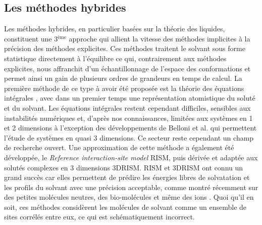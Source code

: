 \subsection{Les méthodes hybrides}
Les méthodes hybrides, en particulier basées sur la théorie des liquides, constituent une 3$^{\text{ème}}$ approche qui allient la vitesse des méthodes implicites à la précision des méthodes explicites. Ces méthodes traitent le solvant sous forme statistique directement à l'équilibre ce qui, contrairement aux méthodes explicites, nous affranchit d'un échantillonnage de l'espace des conformations et permet ainsi un gain de plusieurs ordres de grandeurs en temps de calcul. La première méthode de ce type à avoir été proposée est la théorie des équations intégrales \cite{hansen_theory_2006,gray_theory_1984,hirata_molecular_2003}, avec dans un premier temps une représentation atomistique du soluté et du solvant. Les équations intégrales restent cependant difficiles, sensibles aux instabilités numériques et, d'après nos connaissances, limitées aux systèmes en 1 et 2 dimensions à l'exception des développements de Belloni et al.\cite{Puibasset_bridge_2012, belloni_unpublished} qui permettent l'étude de systèmes en quasi 3 dimensions. Ce secteur reste cependant un champ de recherche ouvert. Une approximation de cette méthode a également été développée, le \textit{Reference interaction-site model} RISM\cite{chandler_optimized_1972}, puis dérivée et adaptée aux solutés complexes en 3 dimensions 3DRISM\cite{Chandler_censity_1986,Kovalenko_self_1999,beglov_integral_1997, du_solvation_2000,  luchko_three-dimensional_2010}. RISM et 3DRISM ont connu un grand succès car elles permettent de prédire les énergies libres de solvatation et les profils du solvant avec une précision acceptable, comme montré récemment sur des petites molécules neutres\cite{roy_predicting_2017, du_solvation_2000, kovalenko_potential_1999, kovalenko_hydration_2000, johnson_small_2016}, des bio-molécules \cite{sindhikara_analysis_2013,imai_hydration_2006,kiyota_new_2011,phongphanphanee_molecular_2010} et même des ions \cite{phongphanphanee_potential_2009, kovalenko_potentials_2000}. Quoi qu'il en soit, ces méthodes considèrent les molécules de solvant comme un ensemble de sites corrélés entre eux, ce qui est schématiquement incorrect.


